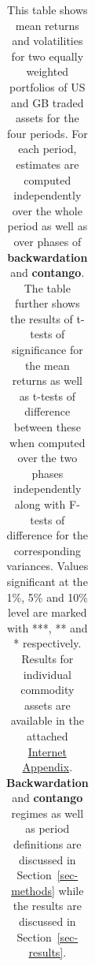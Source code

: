 \documentclass[
  authoryear,
  preprint,
  3p]{elsarticle}
\begin{document}
\begingroup\fontsize{7}{9}\selectfont

\begin{longtable}[t]{>{}l>{}l>{}l>{}r>{}r>{}r>{}r}

\caption{\label{tbl-stats-regime-tests}This table shows mean returns and
volatilities for two equally weighted portfolios of US and GB traded
assets for the four periods. For each period, estimates are computed
independently over the whole period as well as over phases of
\textbf{backwardation} and \textbf{contango}. The table further shows
the results of t-tests of significance for the mean returns as well as
t-tests of difference between these when computed over the two phases
independently along with F-tests of difference for the corresponding
variances. Values significant at the 1\%, 5\% and 10\% level are marked
with ***, ** and * respectively. Results for individual commodity assets
are available in the attached
\href{https://bautheac.shinyapps.io/co-movement/}{Internet Appendix}.
\textbf{Backwardation} and \textbf{contango} regimes as well as period
definitions are discussed in Section~\ref{sec-methods} while the results
are discussed in Section~\ref{sec-results}.}

\tabularnewline


\end{longtable}
\end{document}
